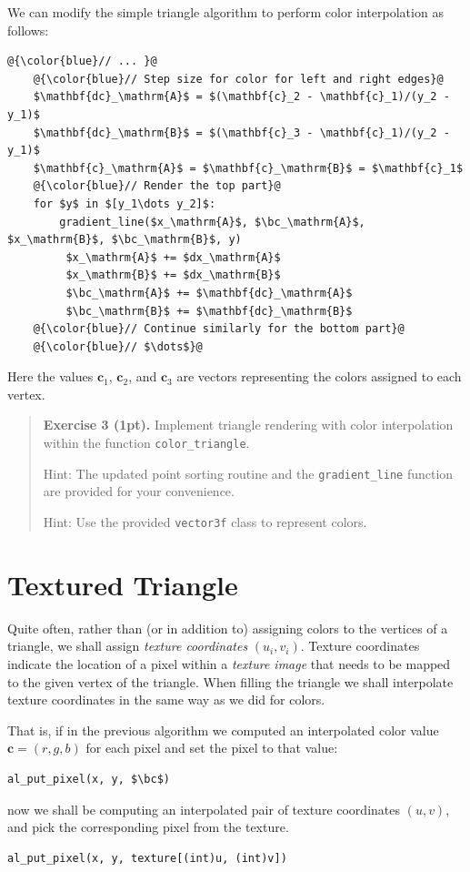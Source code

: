 \documentclass{article}
\newenvironment{exercise}[2]{\begin{verse}\textbf{Exercise #1 (#2pt).} }{
\end{verse}\medskip}
\newcommand{\bc}{\mathbf{c}}
\begin{document}
We can modify the simple triangle algorithm to perform color interpolation as follows:
\begin{lstlisting}[escapechar=@]
	@{\color{blue}// ... }@
	@{\color{blue}// Step size for color for left and right edges}@
	$\mathbf{dc}_\mathrm{A}$ = $(\mathbf{c}_2 - \mathbf{c}_1)/(y_2 - y_1)$
	$\mathbf{dc}_\mathrm{B}$ = $(\mathbf{c}_3 - \mathbf{c}_1)/(y_2 - y_1)$
	$\mathbf{c}_\mathrm{A}$ = $\mathbf{c}_\mathrm{B}$ = $\mathbf{c}_1$
	@{\color{blue}// Render the top part}@
	for $y$ in $[y_1\dots y_2]$:
		gradient_line($x_\mathrm{A}$, $\bc_\mathrm{A}$, $x_\mathrm{B}$, $\bc_\mathrm{B}$, y)
		 $x_\mathrm{A}$ += $dx_\mathrm{A}$
		 $x_\mathrm{B}$ += $dx_\mathrm{B}$
		 $\bc_\mathrm{A}$ += $\mathbf{dc}_\mathrm{A}$
		 $\bc_\mathrm{B}$ += $\mathbf{dc}_\mathrm{B}$
	@{\color{blue}// Continue similarly for the bottom part}@
	@{\color{blue}// $\dots$}@
\end{lstlisting}

Here the values $\bc_1$, $\bc_2$, and $\bc_3$ are vectors representing the colors assigned to each vertex.

\begin{exercise}{3}{1}
Implement triangle rendering with color interpolation within the function \verb#color_triangle#.

Hint: The updated point sorting routine and the \verb#gradient_line# function are provided for your convenience.

Hint: Use the provided \verb#vector3f# class to represent colors.
\end{exercise}

\section{Textured Triangle}
Quite often, rather than (or in addition to) assigning colors to the vertices of a triangle, we shall assign \emph{texture coordinates} $(u_i, v_i)$. Texture coordinates indicate the location of a pixel within a \emph{texture image} that needs to be mapped to the given vertex of the triangle. When filling the triangle we shall interpolate texture coordinates in the same way as we did for colors.

That is, if in the previous algorithm we computed an interpolated color value $\bc = (r,g,b)$ for each pixel and set the pixel to that value:
\begin{lstlisting}[escapechar=@]
	al_put_pixel(x, y, $\bc$)
\end{lstlisting}
now we shall be computing an interpolated pair of texture coordinates $(u, v)$, and pick the corresponding pixel from the texture.
\begin{lstlisting}[escapechar=@]
	al_put_pixel(x, y, texture[(int)u, (int)v])
\end{lstlisting}
\end{document}
